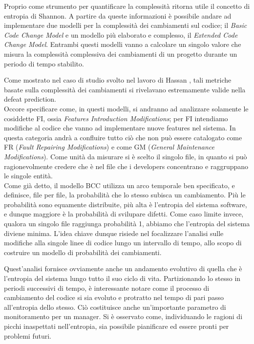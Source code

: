 Proprio come strumento per quantificare la complessità ritorna utile il concetto di entropia di Shannon. A partire da queste informazioni è possibile andare ad implementare due modelli per la complessità dei cambiamenti sul codice; il \textit{Basic Code Change Model} e un modello più elaborato e complesso, il \textit{Extended Code Change Model}. Entrambi questi modelli vanno a calcolare un singolo valore che misura la complessità complessiva dei cambiamenti di un progetto durante un periodo di tempo stabilito. 

Come mostrato nel caso di studio svolto nel lavoro di Hassan \cite{hassan2009predicting}, tali metriche basate sulla complessità dei cambiamenti si rivelavano estremamente valide nella defeat prediction.\\

Occore specificare come, in questi modelli, si andranno ad analizzare solamente le cosiddette FI, ossia \textit{Features Introduction Modifications}; per FI intendiamo modifiche al codice che vanno ad implementare nuove features nel sistema. In questa categoria andrà a confluire tutto ciò che non può essere catalogato come FR (\textit{Fault Repairing Modifications}) e come GM (\textit{General Maintenance Modifications}). Come unità da misurare si è scelto il singolo file, in quanto si può ragionevolmente credere che è nel file che i developers concentrano e raggruppano le singole entità.\\

Come già detto, il modello BCC utilizza un arco temporale ben specificato, e definisce, file per file, la probabilità che lo stesso subisca un cambiamento. Più le probabilità sono equamente distribuite, più alta è l'entropia del sistema software, e dunque maggiore è la probabilità di svilupare difetti. Come caso limite invece, qualora un singolo file raggiunga probabilità 1, abbiamo che l'entropia del sistema diviene minima. L'idea chiave dunque risiede nel focalizzare l'analisi sulle modifiche alla singole linee di codice lungo un intervallo di tempo, allo scopo di costruire un modello di probabilità dei cambiamenti.

Quest'analisi fornisce ovviamente anche un andamento evolutivo di quella che è l'entropia del sistema lungo tutto il suo ciclo di vita. Partizionando lo stesso in periodi successivi di tempo, è interessante notare come il processo di cambiamento del codice si sia evoluto e protratto nel tempo di pari passo all'entropia dello stesso. Ciò costituisce anche un'importante parametro di monitoramento per un manager. Si è osservato come, individuando le ragioni di picchi inaspettati nell'entropia, sia possibile pianificare ed essere pronti per problemi futuri.\\

